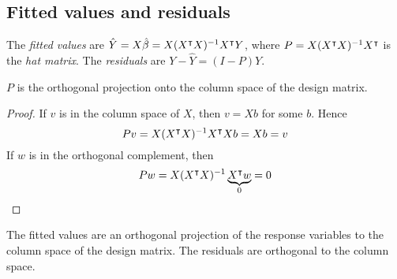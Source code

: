 \subsection{Fitted values and residuals}
\begin{definition}
	The \textit{fitted values} are \( \hat Y = X \hat \beta = X(X^\intercal X)^{-1} X^\intercal Y \), where \( P = X (X^\intercal X)^{-1} X^\intercal \) is the \textit{hat matrix}.
	The \textit{residuals} are \( Y - \hat Y = (I-P)Y \).
\end{definition}
\begin{proposition}
	\( P \) is the orthogonal projection onto the column space of the design matrix.
\end{proposition}
\begin{proof}
	If \( v \) is in the column space of \( X \), then \( v = Xb \) for some \( b \).
	Hence
	\[
		Pv = X(X^\intercal X)^{-1} X^\intercal X b = Xb = v
	\]
	If \( w \) is in the orthogonal complement, then
	\[
		Pw = X(X^\intercal X)^{-1} \underbrace{X^\intercal w}_{0} = 0
	\]
\end{proof}
\begin{corollary}
	The fitted values are an orthogonal projection of the response variables to the column space of the design matrix.
	The residuals are orthogonal to the column space.
\end{corollary}

